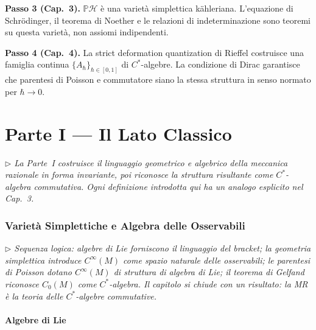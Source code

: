 \documentclass[12pt, a4paper]{article}
\newcommand{\nota}[1]{%
	\par\smallskip
	\noindent\textit{\small $\triangleright$\; #1}
	\par\smallskip
}
\begin{document}
	\medskip
	
	\textbf{Passo 3 (Cap.\ 3).} $\mathbb{P}\mathcal{H}$ è una varietà simplettica
	kähleriana. L'equazione di Schrödinger, il teorema di Noether e le relazioni di
	indeterminazione sono teoremi su questa varietà, non assiomi indipendenti.
	
	\medskip
	
	\textbf{Passo 4 (Cap.\ 4).} La strict deformation quantization di Rieffel costruisce
	una famiglia continua $\{A_\hbar\}_{\hbar\in[0,1]}$ di $C^*$-algebre. La condizione
	di Dirac garantisce che parentesi di Poisson e commutatore siano la stessa struttura
	in senso normato per $\hbar\to 0$.
	
	\newpage
	\part*{Parte I --- Il Lato Classico}
	
	\nota{La Parte~I costruisce il linguaggio geometrico e algebrico della meccanica
		razionale in forma invariante, poi riconosce la struttura risultante come
		$C^*$-algebra commutativa. Ogni definizione introdotta qui ha un analogo esplicito
		nel Cap.\ 3.}
	
	\section{Varietà Simplettiche e Algebra delle Osservabili}
	
	\nota{Sequenza logica: algebre di Lie forniscono il linguaggio del bracket; la geometria
		simplettica introduce $C^\infty(M)$ come spazio naturale delle osservabili; le
		parentesi di Poisson dotano $C^\infty(M)$ di struttura di algebra di Lie; il teorema
		di Gelfand riconosce $C_0(M)$ come $C^*$-algebra. Il capitolo si chiude con un
		risultato: la MR \emph{è} la teoria delle $C^*$-algebre commutative.}
	
	\subsection{Algebre di Lie}
	
\end{document}
